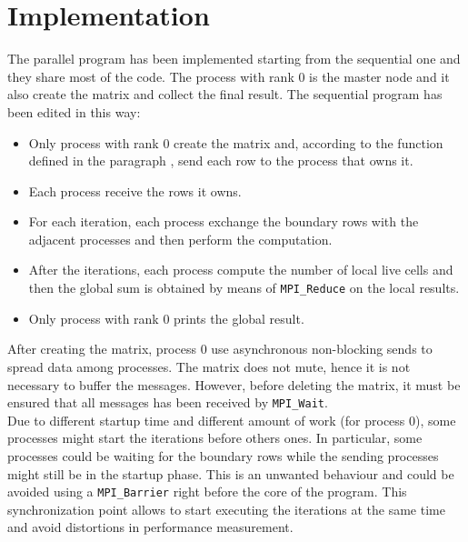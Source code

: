 \documentclass{article}
\begin{document}
\section{Implementation}
The parallel program has been implemented starting from the sequential one and they share most of the code. The process with rank 0 is the master node and it also create the matrix and collect the final result. The sequential program has been edited in this way:
\begin{itemize}
    \item Only process with rank 0 create the matrix and, according to the function defined in the paragraph , send each row to the process that owns it.
    \item Each process receive the rows it owns.
    \item For each iteration, each process exchange the boundary rows with the adjacent processes and then perform the computation.
    \item After the iterations, each process compute the number of local live cells and then the global sum is obtained by means of \texttt{MPI\_Reduce} on the local results.
    \item Only process with rank 0 prints the global result.
\end{itemize}
After creating the matrix, process 0 use asynchronous non-blocking sends to spread data among processes. The matrix does not mute, hence it is not necessary to buffer the messages. However, before deleting the matrix, it must be ensured that all messages has been received by \texttt{MPI\_Wait}. \\
Due to different startup time and different amount of work (for process 0), some processes might start the iterations before others ones. In particular, some processes could be waiting for the boundary rows while the sending processes might still be in the startup phase. This is an unwanted behaviour and could be avoided using a \texttt{MPI\_Barrier} right before the core of the program. This synchronization point allows to start executing the iterations at the same time and avoid distortions in performance measurement. \\
\end{document}
